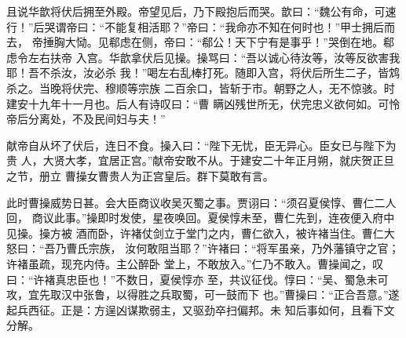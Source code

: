 且说华歆将伏后拥至外殿。帝望见后，乃下殿抱后而哭。歆曰：“魏公有命，可速
行！”后哭谓帝曰：“不能复相活耶？”帝曰：“我命亦不知在何时也！”甲士拥后而去，
帝捶胸大恸。见郗虑在侧，帝曰：“郗公！天下宁有是事乎！”哭倒在地。郗虑令左右扶帝
入宫。华歆拿伏后见操。操骂曰：“吾以诚心待汝等，汝等反欲害我耶！吾不杀汝，汝必杀
我！”喝左右乱棒打死。随即入宫，将伏后所生二子，皆鸩杀之。当晚将伏完、穆顺等宗族
二百余口，皆斩于市。朝野之人，无不惊骇。时建安十九年十一月也。后人有诗叹曰：“曹
瞒凶残世所无，伏完忠义欲何如。可怜帝后分离处，不及民间妇与夫！”

献帝自从坏了伏后，连日不食。操入曰：“陛下无忧，臣无异心。臣女已与陛下为贵
人，大贤大孝，宜居正宫。”献帝安敢不从。于建安二十年正月朔，就庆贺正旦之节，册立
曹操女曹贵人为正宫皇后。群下莫敢有言。

此时曹操威势日甚。会大臣商议收吴灭蜀之事。贾诩曰：“须召夏侯惇、曹仁二人回，
商议此事。”操即时发使，星夜唤回。夏侯惇未至，曹仁先到，连夜便入府中见操。操方被
酒而卧，许褚仗剑立于堂门之内，曹仁欲入，被许褚当住。曹仁大怒曰：“吾乃曹氏宗族，
汝何敢阻当耶？”许褚曰：“将军虽亲，乃外藩镇守之官；许褚虽疏，现充内侍。主公醉卧
堂上，不敢放入。”仁乃不敢入。曹操闻之，叹曰：“许褚真忠臣也！”不数日，夏侯惇亦
至，共议征伐。惇曰：“吴、蜀急未可攻，宜先取汉中张鲁，以得胜之兵取蜀，可一鼓而下
也。”曹操曰：“正合吾意。”遂起兵西征。正是：方逞凶谋欺弱主，又驱劲卒扫偏邦。未
知后事如何，且看下文分解。